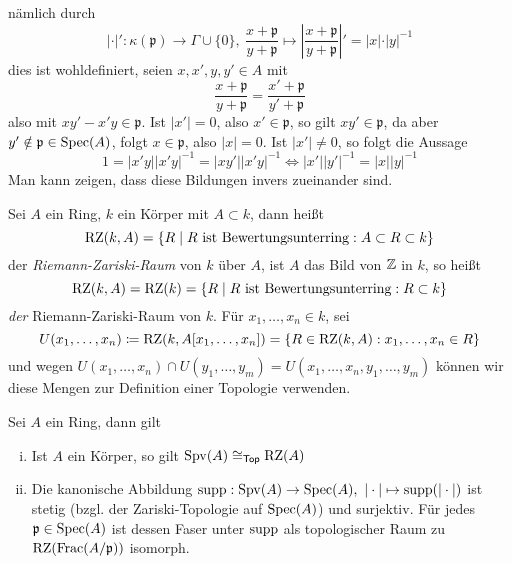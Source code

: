 nämlich durch 
\[
\vert\cdot\vert':\kappa(\mathfrak{p}) \to \Gamma \cup \{0\}, \ \frac{x+\mathfrak{p}}{y+\mathfrak{p}}\mapsto \left\vert \frac{x+\mathfrak{p}}{y+\mathfrak{p}}\right\vert'=\vert x\vert \cdot \vert y\vert^{-1}     
\]
dies ist wohldefiniert, seien $x,x',y,y'\in A$ mit 
\[
\frac{x+\mathfrak{p}}{y+\mathfrak{p}} = \frac{x'+\mathfrak{p}}{y'+\mathfrak{p}}    
\]
also mit $xy'-x'y\in \mathfrak{p}$. Ist $\vert x'\vert =0$, also $x'\in \mathfrak{p}$, so gilt $xy'\in \mathfrak{p}$, da aber $y'\notin \mathfrak{p}\in \operatorname{Spec}(A)$, folgt $x\in \mathfrak{p}$, also $\vert x\vert =0$. Ist $\vert x'\vert \neq 0$, so folgt die Aussage 
\[
1 = \vert x'y\vert \vert x'y\vert^{-1} = \vert xy'\vert \vert x'y\vert^{-1} \iff \vert x'\vert\vert y'\vert^{-1} = \vert x\vert \vert y\vert^{-1}     
\]
Man kann zeigen, dass diese Bildungen invers zueinander sind. 
\begin{remind} Sei $A$ ein Ring, $k$ ein Körper mit $A\subset k$, dann heißt 
    \[
    \operatorname{RZ}(k,A) = \{ R \mid R\text{ ist Bewertungsunterring}:A\subset R\subset k\}    
    \]
    der \textit{Riemann-Zariski-Raum} von $k$ über $A$, ist $A$ das Bild von $\mathbb{Z}$ in $k$, so heißt 
    \[
    \operatorname{RZ}(k,A) = \operatorname{RZ}(k) = \{ R \mid R\text{ ist Bewertungsunterring}:R\subset k\}     
    \]
    \textit{der} Riemann-Zariski-Raum von $k$. Für $x_1,\ldots,x_n\in k$, sei 
    \[
    U(x_1,\ldots,x_n) \coloneqq \operatorname{RZ}(k,A[x_1,\ldots,x_n]) = \{ R\in \operatorname{RZ}(k,A) : x_1,\ldots,x_n\in R\}    
    \]
    und wegen $U(x_1,\ldots,x_n)\cap U(y_1,\ldots,y_m) = U(x_1,\ldots,x_n,y_1,\ldots,y_m)$ können wir diese Mengen zur Definition
    einer Topologie verwenden.
\end{remind}
\begin{lemma}
    Sei $A$ ein Ring, dann gilt 
    \begin{enumerate}[(i)]
        \item Ist $A$ ein Körper, so gilt $\operatorname{Spv}(A) \cong_{\mathsf{Top}} \operatorname{RZ}(A)$
        \item Die kanonische Abbildung $\operatorname{supp} : \operatorname{Spv}(A) \to \operatorname{Spec}(A),\ \vert\cdot\vert \mapsto \operatorname{supp}(\vert\cdot\vert)$ ist stetig (bzgl. der Zariski-Topologie auf $\operatorname{Spec}(A)$) und surjektiv. Für jedes $\mathfrak{p}\in \operatorname{Spec}(A)$ ist dessen Faser unter $\operatorname{supp}$ als topologischer Raum zu $\operatorname{RZ}(\operatorname{Frac}(A/\mathfrak{p}))$ isomorph.
    \end{enumerate}
\end{lemma}

